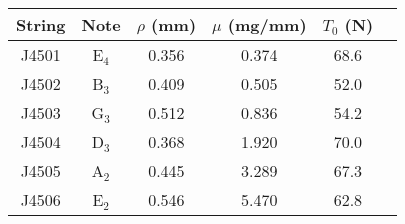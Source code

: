 \begin{tabular}{cccccc}
\toprule
String & Note & $\rho$ (mm) & $\mu$ (mg/mm) & $T_0$ (N) \\
\midrule
J4501 & E$_{4}$ & 0.356 & 0.374 & 68.6 \\
J4502 & B$_{3}$ & 0.409 & 0.505 & 52.0 \\
J4503 & G$_{3}$ & 0.512 & 0.836 & 54.2 \\
J4504 & D$_{3}$ & 0.368 & 1.920 & 70.0 \\
J4505 & A$_{2}$ & 0.445 & 3.289 & 67.3 \\
J4506 & E$_{2}$ & 0.546 & 5.470 & 62.8 \\
\bottomrule
\end{tabular}

